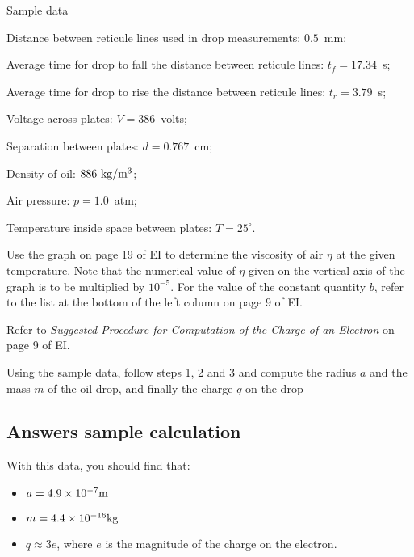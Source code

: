 Sample data
\begin{itemize*}
\item Distance between reticule lines used in drop measurements: $0.5$~mm;
\item Average time for drop to fall the distance between reticule lines: $t_f =
  17.34$~s; 
\item Average time for drop to rise the distance between reticule lines: $t_r =
  3.79$~s; 
\item Voltage across plates: $V = 386$~volts;
\item Separation between plates: $d = 0.767$~cm;
\item Density of oil: $886~{\rm kg}/{\rm m}^3$;
\item Air pressure: $p=1.0$~atm;
\item Temperature inside space between plates: $T= 25^\circ$.
\end{itemize*}

Use the graph on page 19 of EI to determine the viscosity of air $\eta$ at
the given temperature.  Note that the numerical value of
$\eta$ given on the vertical axis of the graph is
to be multiplied by $10^{-5}$.  For
the value of the constant quantity $b$, refer to the list at the bottom
of the left column on page 9 of EI.

Refer to {\em Suggested Procedure for Computation of
the Charge of an Electron} on page 9 of EI.

Using the sample data, follow steps 1, 2 and 3 and compute the radius $a$
and the mass $m$ of the oil drop, and finally the charge $q$ on the drop


\subsection{Answers sample calculation}

With this data, you should find that:
\begin{itemize}
\item $a = 4.9 \times 10^{-7} {\rm m}$

\item $m = 4.4 \times 10^{-16} {\rm kg}$

\item $q \approx 3e$, where $e$ is the magnitude of
the charge on the electron.
\end{itemize}


